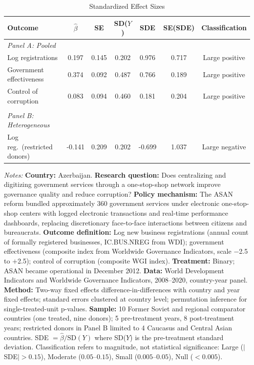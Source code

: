 \begin{table}[htbp]
\centering
\caption{Standardized Effect Sizes}
\label{tab:sde}
\begin{tabular}{lcccccc}
\hline\hline
Outcome & $\hat{\beta}$ & SE & SD($Y$) & SDE & SE(SDE) & Classification \\
\hline
\textit{Panel A: Pooled} & & & & & & \\
Log registrations & 0.197 & 0.145 & 0.202 & 0.976 & 0.717 & Large positive \\
Government effectiveness & 0.374 & 0.092 & 0.487 & 0.766 & 0.189 & Large positive \\
Control of corruption & 0.083 & 0.094 & 0.460 & 0.181 & 0.204 & Large positive \\
 & & & & & & \\
\textit{Panel B: Heterogeneous} & & & & & & \\
Log reg.\ (restricted donors) & -0.141 & 0.209 & 0.202 & -0.699 & 1.037 & Large negative \\
\hline\hline
\end{tabular}
\par\vspace{0.3em}
{\footnotesize \textit{Notes:} \textbf{Country:} Azerbaijan. \textbf{Research question:} Does centralizing and digitizing government services through a one-stop-shop network improve governance quality and reduce corruption? \textbf{Policy mechanism:} The ASAN reform bundled approximately 360 government services under electronic one-stop-shop centers with logged electronic transactions and real-time performance dashboards, replacing discretionary face-to-face interactions between citizens and bureaucrats. \textbf{Outcome definition:} Log new business registrations (annual count of formally registered businesses, IC.BUS.NREG from WDI); government effectiveness (composite index from Worldwide Governance Indicators, scale $-$2.5 to $+$2.5); control of corruption (composite WGI index). \textbf{Treatment:} Binary; ASAN became operational in December 2012. \textbf{Data:} World Development Indicators and Worldwide Governance Indicators, 2008--2020, country-year panel. \textbf{Method:} Two-way fixed effects difference-in-differences with country and year fixed effects; standard errors clustered at country level; permutation inference for single-treated-unit p-values. \textbf{Sample:} 10 Former Soviet and regional comparator countries (one treated, nine donors); 5 pre-treatment years, 8 post-treatment years; restricted donors in Panel B limited to 4 Caucasus and Central Asian countries. SDE $= \hat{\beta} / \text{SD}(Y)$ where SD($Y$) is the pre-treatment standard deviation. Classification refers to magnitude, not statistical significance: Large ($|$SDE$| > 0.15$), Moderate ($0.05$--$0.15$), Small ($0.005$--$0.05$), Null ($< 0.005$).}
\end{table}
